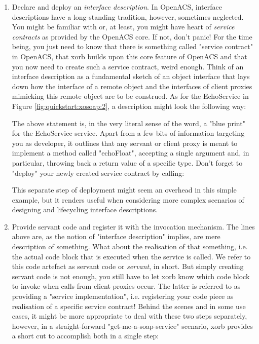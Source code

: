 \begin{enumerate}
\item Declare and deploy an \emph{interface description}. In OpenACS, interface descriptions have a long-standing tradition, however, sometimes neglected. You might be familiar with or, at least, you might have heart of \emph{service contracts} as provided by the OpenACS core. If not, don't panic! For the time being, you just need to know that there is something called "service contract" in OpenACS, that xorb builds upon this core feature of OpenACS and that you now need to create such a service contract, weird enough. Think of an interface description as a fundamental sketch of an object interface that lays down how the interface of a remote object and the interfaces of client proxies mimicking this remote object are to be construed. As for the EchoService in Figure \ref{fig:quickstart:xosoap:2}, a description might look the following way:

The above statement is, in the very literal sense of the word, a "blue print" for the EchoService service. Apart from a few bits of information targeting you as developer, it outlines that any servant or client proxy is meant to implement a method called "echoFloat", accepting a single argument and, in particular, throwing back a return value of a specific type. Don't forget to "deploy" your newly created service contract by calling:

This separate step of deployment might seem an overhead in this simple example, but it renders useful when considering more complex scenarios of designing and lifecycling interface descriptions.
\item Provide servant code and register it with the invocation mechanism. The lines above are, as the notion of "interface description" implies, are mere description of something. What about the realisation of that something, i.e. the actual code block that is executed when the service is called. We refer to this code artefact as servant code or \emph{servant}, in short. But simply creating servant code is not enough, you still have to let xorb know which code block to invoke when calls from client proxies occur. The latter is referred to as providing a "service implementation", i.e. registering your code piece as realisation of a specific service contract! Behind the scenes and in some use cases, it might be more appropriate to deal with these two steps separately, however, in a straight-forward "get-me-a-soap-service" scenario, xorb provides a short cut to accomplish both in a single step:

\end{enumerate}
